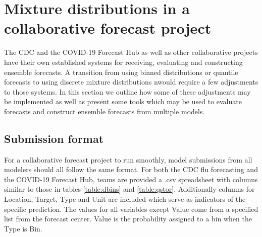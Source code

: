 \documentclass[11pt,notitlepage]{isuthesis}
\begin{document}
\section{Mixture distributions in a collaborative forecast project}
\label{section:conmixforc}


The CDC and the COVID-19 Forecast Hub as well as other collaborative projects
have their own established systems for receiving, 
evaluating and constructing ensemble forecasts. A transition from using binned 
distributions or quantile forecasts to using discrete mixture distributions 
nwould require
a few adjustments to those systems. In this section we outline how some of these
adjustments may be implemented as well as present some tools which may be used
to evaluate forecasts and construct ensemble forecasts from multiple models.

\subsection{Submission format}
For a collaborative forecast project to run smoothly, model submissions from all 
modelers should all follow the same format. For both the CDC flu forecasting and
the COVID-19 Forecast Hub, teams are provided a .csv spreadsheet with columns 
similar to those in tables \ref{table:dbins} and \ref{table:qstor}. Additionally
columns for Location, Target, Type and Unit are included which serve as
indicators of the specific prediction. The values for all variables except 
Value come from a specified list from the forecast center. Value is the 
probability assigned to a bin when the Type is Bin.
\end{document}
